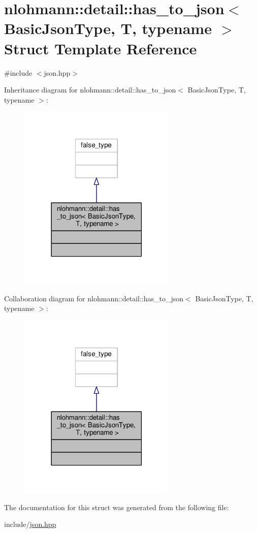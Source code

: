 \hypertarget{structnlohmann_1_1detail_1_1has__to__json}{}\section{nlohmann\+:\+:detail\+:\+:has\+\_\+to\+\_\+json$<$ Basic\+Json\+Type, T, typename $>$ Struct Template Reference}
\label{structnlohmann_1_1detail_1_1has__to__json}


{\ttfamily \#include $<$json.\+hpp$>$}



Inheritance diagram for nlohmann\+:\+:detail\+:\+:has\+\_\+to\+\_\+json$<$ Basic\+Json\+Type, T, typename $>$\+:
\nopagebreak
\begin{figure}[H]
\begin{center}
\leavevmode
\includegraphics[width=213pt]{structnlohmann_1_1detail_1_1has__to__json__inherit__graph}
\end{center}
\end{figure}


Collaboration diagram for nlohmann\+:\+:detail\+:\+:has\+\_\+to\+\_\+json$<$ Basic\+Json\+Type, T, typename $>$\+:
\nopagebreak
\begin{figure}[H]
\begin{center}
\leavevmode
\includegraphics[width=213pt]{structnlohmann_1_1detail_1_1has__to__json__coll__graph}
\end{center}
\end{figure}


The documentation for this struct was generated from the following file\+:\begin{DoxyCompactItemize}
\item 
include/\hyperlink{json_8hpp}{json.\+hpp}\end{DoxyCompactItemize}
